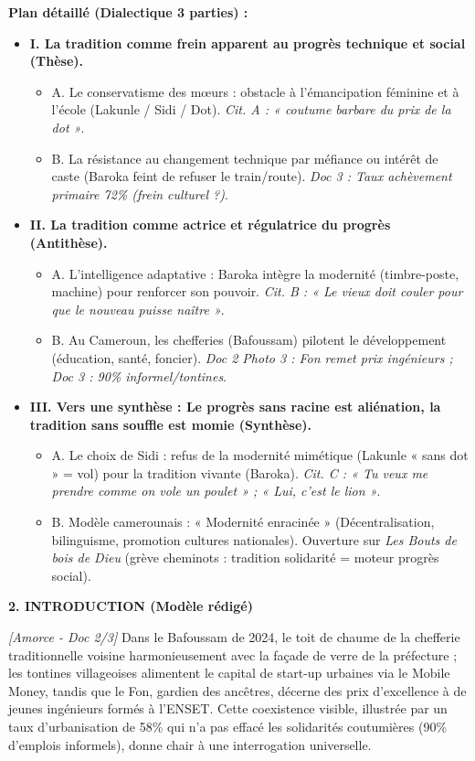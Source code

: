 \documentclass[11pt]{article}
\begin{document}
\begin{exoresolu}
\noindent \textbf{Plan détaillé (Dialectique 3 parties) :}
\begin{itemize}
    \item \textbf{I. La tradition comme frein apparent au progrès technique et social (Thèse).}
    \begin{itemize}
        \item A. Le conservatisme des mœurs : obstacle à l'émancipation féminine et à l'école (Lakunle / Sidi / Dot). \textit{Cit. A : « coutume barbare du prix de la dot »}.
        \item B. La résistance au changement technique par méfiance ou intérêt de caste (Baroka feint de refuser le train/route). \textit{Doc 3 : Taux achèvement primaire 72\% (frein culturel ?)}.
    \end{itemize}
    \item \textbf{II. La tradition comme actrice et régulatrice du progrès (Antithèse).}
    \begin{itemize}
        \item A. L'intelligence adaptative : Baroka intègre la modernité (timbre-poste, machine) pour renforcer son pouvoir. \textit{Cit. B : « Le vieux doit couler pour que le nouveau puisse naître »}.
        \item B. Au Cameroun, les chefferies (Bafoussam) pilotent le développement (éducation, santé, foncier). \textit{Doc 2 Photo 3 : Fon remet prix ingénieurs ; Doc 3 : 90\% informel/tontines}.
    \end{itemize}
    \item \textbf{III. Vers une synthèse : Le progrès sans racine est aliénation, la tradition sans souffle est momie (Synthèse).}
    \begin{itemize}
        \item A. Le choix de Sidi : refus de la modernité mimétique (Lakunle « sans dot » = vol) pour la tradition vivante (Baroka). \textit{Cit. C : « Tu veux me prendre comme on vole un poulet » ; « Lui, c'est le lion »}.
        \item B. Modèle camerounais : « Modernité enracinée » (Décentralisation, bilinguisme, promotion cultures nationales). Ouverture sur \emph{Les Bouts de bois de Dieu} (grève cheminots : tradition solidarité = moteur progrès social).
    \end{itemize}
\end{itemize}

\medskip
\noindent \textbf{2. INTRODUCTION (Modèle rédigé)}

\noindent \textit{[Amorce - Doc 2/3]} Dans le Bafoussam de 2024, le toit de chaume de la chefferie traditionnelle voisine harmonieusement avec la façade de verre de la préfecture ; les tontines villageoises alimentent le capital de start-up urbaines via le Mobile Money, tandis que le Fon, gardien des ancêtres, décerne des prix d'excellence à de jeunes ingénieurs formés à l'ENSET. Cette coexistence visible, illustrée par un taux d'urbanisation de 58\% qui n'a pas effacé les solidarités coutumières (90\% d'emplois informels), donne chair à une interrogation universelle.


\end{exoresolu}
\end{document}
